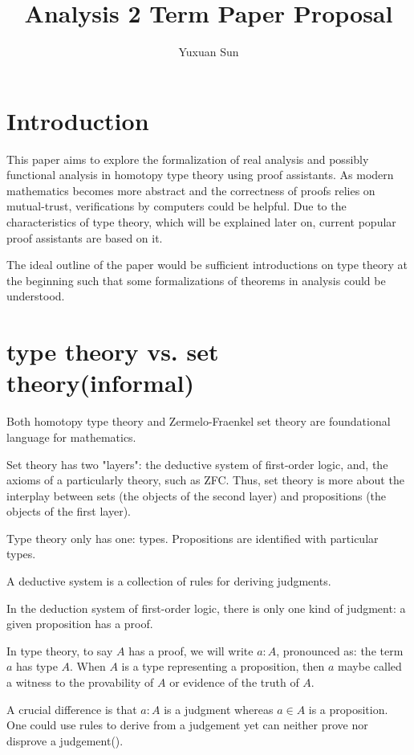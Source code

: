 \documentclass[a4paper]{article}
\title{Analysis 2 Term Paper Proposal}
\author{Yuxuan Sun}
\theoremstyle{definition}
\begin{document}
	
\maketitle

\section{Introduction}
This paper aims to explore the formalization of real analysis and possibly functional analysis in homotopy type theory using proof assistants. As modern mathematics becomes more abstract and the correctness of proofs relies on mutual-trust, verifications by computers could be helpful. Due to the characteristics of type theory, which will be explained later on, current popular proof assistants are based on it.

The ideal outline of the paper would be sufficient introductions on type theory at the beginning such that some formalizations of theorems in analysis could be understood. 

\section{type theory vs. set theory(informal)}

Both homotopy type theory and Zermelo-Fraenkel set theory are foundational language for mathematics.

Set theory has two "layers": the deductive system of first-order logic, and, the axioms of a particularly theory, such as ZFC. Thus, set theory is more about the interplay between sets (the objects of the second layer) and propositions (the objects of the first layer).

Type theory only has one: types. Propositions are identified with particular types.

A deductive system is a collection of rules for deriving judgments.

In the deduction system of first-order logic, there is only one kind of judgment: a given proposition has a proof.

In type theory, to say $A$ has a proof, we will write $a : A$, pronounced as: the term  $a$ has type  $A$. When $A$ is a type representing a proposition, then  $a$ maybe called a witness to the provability of  $A$ or evidence of the truth of  $A$.

A crucial difference is that $a: A$ is a judgment whereas  $a \in A$ is a proposition. One could use rules to derive from a judgement yet can neither prove nor disprove a judgement(\citep{program_homotopy_2013}).
\end{document}
